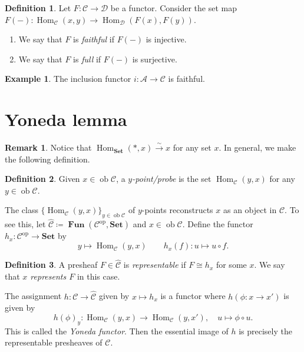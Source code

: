 \documentclass[10pt,letterpaper,cm]{nupset}
\theoremstyle{definition}
\newtheorem*{definition}{Definition}
\newtheorem{exmp}{Example}
\newtheorem{remark}{Remark}
\newcommand{\1}{\mathbf{1}}
\renewcommand{\a}{\mathscr{A}}
\renewcommand{\c}{\mathscr{C}}
\renewcommand{\d}{\mathscr{D}}
\newcommand{\0}{\vec 0}
\DeclareMathOperator{\op}{op}
\DeclareMathOperator{\ob}{ob}
\DeclareMathOperator{\Hom}{Hom}
\DeclareMathOperator{\Fun}{\mathbf{Fun}}
\begin{document}
\begin{definition} Let $F: \c \to \d$ be a functor. Consider the set map $F({-}): \Hom_{\c}(x,y) \to \Hom_{\d}(F(x), F(y))$.
\begin{enumerate}
\item We say that $F$ is \textit{faithful} if $F({-})$ is injective.
\item We say that $F$ is \textit{full} if $F({-})$ is surjective. 
\end{enumerate}
\end{definition}

\begin{exmp}
The inclusion functor $i : \a \to \c$ is faithful.
\end{exmp}

\section{Yoneda lemma}

\begin{remark}
Notice that $\Hom_{\mathbf{Set}}(\ast, x) \overset{\sim}{\longrightarrow} x$ for any set $x$. In general, we make the following definition.
\begin{definition}
Given $x \in \ob \c$, a \textit{$y$-point/probe} is the set $\Hom_{\c}(y, x)$ for any $y \in \ob \c$.
\end{definition}
The class $\{\Hom_{\c}(y, x)\}_{y\in \ob \c}$ of $y$-points reconstructs $x$ as an object in $\c$. To see this, let $\widehat{\c}\coloneqq  \Fun(\c^{\op}, \mathbf{Set})$ and $x \in \ob \c$. Define the functor $h_x : \c^{\op} \to \mathbf{Set}$ by $$y \mapsto \Hom_{\c}(y, x) \quad \quad h_x(f) : u \mapsto u \circ f.$$ 
\begin{definition}
A presheaf $F \in \widehat{\c}$ is \textit{representable} if $F \cong h_x$ for some $x$. We say that \textit{$x$ represents $F$} in this case.
\end{definition}
The assignment $h: \c \to \widehat{\c}$ given by $x \mapsto h_x$ is a functor where $h(\phi : x \to x')$ is given by $$h(\phi)_y : \Hom_{\c}(y, x) \to \Hom_{\c}(y, x'), \quad u \mapsto \phi \circ u.$$ This is called the \textit{Yoneda functor}. Then the essential image of $h$ is precisely the representable presheaves of $\c$.
\end{remark}
\end{document}
